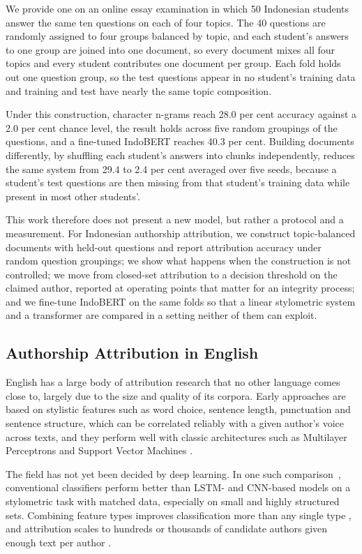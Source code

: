 \documentclass[runningheads]{llncs}
\begin{document}
We provide one on an online essay examination in which 50 Indonesian students answer the same ten questions on each of four topics. The 40 questions are randomly assigned to four groups balanced by topic, and each student's answers to one group are joined into one document, so every document mixes all four topics and every student contributes one document per group. Each fold holds out one question group, so the test questions appear in no student's training data and training and test have nearly the same topic composition.

Under this construction, character n-grams reach 28.0 per cent accuracy against a 2.0 per cent chance level, the result holds across five random groupings of the questions, and a fine-tuned IndoBERT reaches 40.3 per cent. Building documents differently, by shuffling each student's answers into chunks independently, reduces the same system from 29.4 to 2.4 per cent averaged over five seeds, because a student's test questions are then missing from that student's training data while present in most other students'.

This work therefore does not present a new model, but rather a protocol and a measurement. For Indonesian authorship attribution, we construct topic-balanced documents with held-out questions and report attribution accuracy under random question groupings; we show what happens when the construction is not controlled; we move from closed-set attribution to a decision threshold on the claimed author, reported at operating points that matter for an integrity process; and we fine-tune IndoBERT on the same folds so that a linear stylometric system and a transformer are compared in a setting neither of them can exploit.

\subsection{Authorship Attribution in English}

English has a large body of attribution research that no other language comes close to, largely due to the size and quality of its corpora. Early approaches are based on stylistic features such as word choice, sentence length, punctuation and sentence structure, which can be correlated reliably with a given author's voice across texts, and they perform well with classic architectures such as Multilayer Perceptrons and Support Vector Machines \cite{Sayoud2025}.

The field has not yet been decided by deep learning. In one such comparison~\cite{Sayoud2025}, conventional classifiers perform better than LSTM- and CNN-based models on a stylometric task with matched data, especially on small and highly structured sets. Combining feature types improves classification more than any single type \cite{Suljic2024}, and attribution scales to hundreds or thousands of candidate authors given enough text per author \cite{Bauersfeld2023}.
\end{document}
